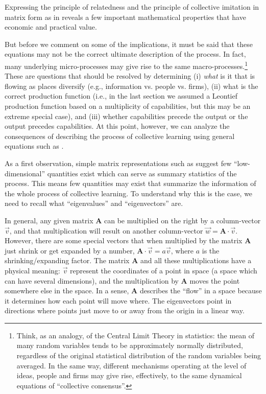 \documentclass[12pt]{article}
\newcommand{\mtx}[1]{\mathbf{ #1}}
\begin{document}
Expressing the principle of relatedness and the principle of collective imitation in matrix form as in  reveals a few important mathematical properties that have economic and practical value. 

But before we comment on some of the implications, it must be said that these equations may not be the correct ultimate description of the process. In fact, many underlying micro-processes may give rise to the same macro-processes.\footnote{Think, as an analogy, of the Central Limit Theory in statistics: the mean of many random variables tends to be approximately normally distributed, regardless of the original statistical distribution of the random variables being averaged. In the same way, different mechanisms operating at the level of ideas, people and firms may give rise, effectively, to the same dynamical equations of ``collective consensus''.} These are questions that should be resolved by determining (i) \emph{what} is it that is flowing as places diversify (e.g., information vs. people vs. firms), (ii) what is the correct production function (i.e., in the last section we assumed a Leontief production function based on a multiplicity of capabilities, but this may be an extreme special case), and (iii) whether capabilities precede the output or the output precedes capabilities. At this point, however, we can analyze the consequences of describing the process of collective learning using general equations such as .

As a first observation, simple matrix representations such as  suggest few ``low-dimensional'' quantities exist which can serve as summary statistics of the process. This means few quantities may exist that summarize the information of the whole process of collective learning. To understand why this is the case, we need to recall what ``eigenvalues'' and ``eigenvectors'' are. 

In general, any given matrix $\mtx{A}$ can be multiplied on the right by a column-vector $\vec{v}$, and that multiplication will result on another column-vector $\vec{w}=\mtx{A}\cdot\vec{v}$. However, there are some special vectors that when multiplied by the matrix $\mtx{A}$ just shrink or get expanded by a number, $\mtx{A}\cdot\vec{v} = a\vec{v}$, where $a$ is the shrinking/expanding factor. The matrix $\mtx{A}$ and all these multiplications have a physical meaning: $\vec{v}$ represent the coordinates of a point in space (a space which can have several dimensions), and the multiplication by $\mtx{A}$ moves the point somewhere else in the space. In a sense, $\mtx{A}$ describes the ``flow'' in a space because it determines how each point will move where. The eigenvectors point in directions where points just move to or away from the origin in a linear way.
\end{document}
